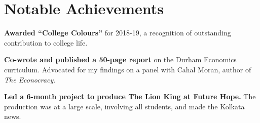 \documentclass[a4]{article}
\renewenvironment{itemize}{
  \begin{list}{}{
    \setlength{\leftmargin}{1.5em}
  }
}{
  \end{list}
}
\begin{document}
\section*{Notable Achievements}
\begin{itemize}
\item \textbf{Awarded ``College Colours''} for 2018-19, a recognition of outstanding contribution to college life.
\item \textbf{Co-wrote and published a 50-page report} on the Durham Economics curriculum. Advocated for my findings on a panel with Cahal Moran, author of \textit{The Econocracy}.
\item \textbf{Led a 6-month project to produce The Lion King at Future Hope.} The production was at a large scale, involving all students, and made the Kolkata news.
\end{itemize}



\end{document}
